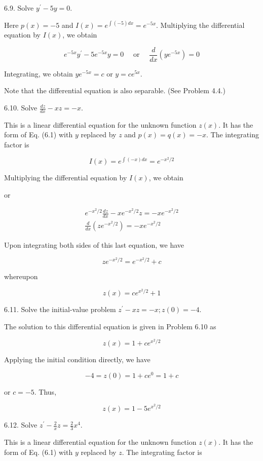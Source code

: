 \documentclass[10pt]{article}
\begin{document}
6.9. Solve $y^{\prime}-5 y=0$.

Here $p(x)=-5$ and $I(x)=e^{\int(-5) d x}=e^{-5 x}$. Multiplying the differential equation by $I(x)$, we obtain

$$
e^{-5 x} y^{\prime}-5 e^{-5 x} y=0 \quad \text { or } \quad \frac{d}{d x}\left(y e^{-5 x}\right)=0
$$

Integrating, we obtain $y e^{-5 x}=c$ or $y=c e^{5 x}$.

Note that the differential equation is also separable. (See Problem 4.4.)

6.10. Solve $\frac{d z}{d x}-x z=-x$.

This is a linear differential equation for the unknown function $z(x)$. It has the form of Eq. (6.1) with $y$ replaced by $z$ and $p(x)=q(x)=-x$. The integrating factor is

$$
I(x)=e^{\int(-x) d x}=e^{-x^{2} / 2}
$$

Multiplying the differential equation by $I(x)$, we obtain

or

$$
\begin{gathered}
e^{-x^{2} / 2} \frac{d z}{d x}-x e^{-x^{2} / 2} z=-x e^{-x^{2} / 2} \\
\frac{d}{d x}\left(z e^{-x^{2} / 2}\right)=-x e^{-x^{2} / 2}
\end{gathered}
$$

Upon integrating both sides of this last equation, we have

$$
z e^{-x^{2} / 2}=e^{-x^{2} / 2}+c
$$

whereupon

$$
z(x)=c e^{x^{2} / 2}+1
$$

6.11. Solve the initial-value problem $z^{\prime}-x z=-x ; z(0)=-4$.

The solution to this differential equation is given in Problem 6.10 as

$$
z(x)=1+c e^{x^{2} / 2}
$$

Applying the initial condition directly, we have

$$
-4=z(0)=1+c e^{0}=1+c
$$

or $c=-5$. Thus,

$$
z(x)=1-5 e^{x^{2} / 2}
$$

6.12. Solve $z^{\prime}-\frac{2}{x} z=\frac{2}{3} x^{4}$.

This is a linear differential equation for the unknown function $z(x)$. It has the form of Eq. (6.1) with $y$ replaced by $z$. The integrating factor is
\end{document}
